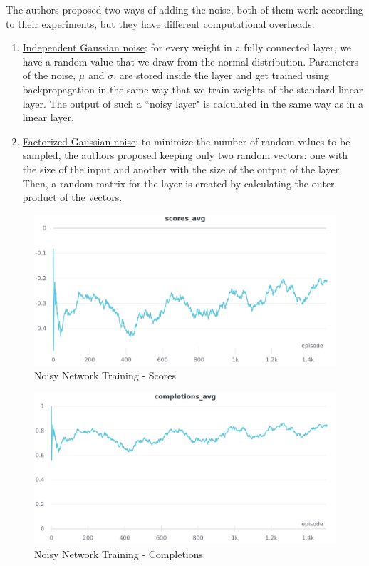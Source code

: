 \documentclass[12pt]{article}
\begin{document}
The authors proposed two ways of adding the noise, both of them work according to their experiments,
but they have different computational overheads:
\begin{enumerate}
    \item \underline{Independent Gaussian noise}: for every weight in a fully connected layer, we have a random
    value that we draw from the normal distribution. Parameters of the noise, $\mu$ and $\sigma$, are stored
    inside the layer and get trained using backpropagation in the same way that we train weights of the
    standard linear layer. The output of such a ``noisy layer" is calculated in the same way as in a linear layer.
    \item \underline{Factorized Gaussian noise}: to minimize the number of random values to be sampled, the
    authors proposed keeping only two random vectors: one with the size of the input and another
    with the size of the output of the layer. Then, a random matrix for the layer is created by
    calculating the outer product of the vectors.
\end{enumerate}

\begin{figure}[H]
        \centerline{\includegraphics[scale=.2]{res/charts/noisy_scores.png}}
        \caption{Noisy Network Training - Scores}
\end{figure}

\begin{figure}[H]
        \centerline{\includegraphics[scale=.2]{res/charts/noisy_completions.png}}
        \caption{Noisy Network Training - Completions}
\end{figure}
\end{document}
